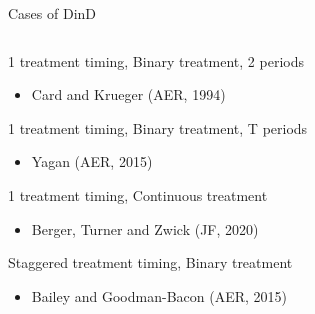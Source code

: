 \documentclass[notes,11pt, aspectratio=169]{beamer}
\newenvironment{wideitemize}{\itemize\addtolength{\itemsep}{10pt}}{\enditemize}
\begin{document}
\begin{frame}{Cases of DinD}
  \begin{columns}[T] %
    \begin{column}{.58\textwidth}
      \begin{wideitemize}
      \item 1 treatment timing, Binary treatment, 2 periods
        \begin{itemize}
        \item Card and Krueger  (AER, 1994)
        \end{itemize}
      \item 1 treatment timing, Binary treatment, T periods
        \begin{itemize}
        \item Yagan (AER, 2015) 
        \end{itemize}
      \item 1 treatment timing, Continuous treatment
        \begin{itemize}
        \item Berger, Turner and Zwick (JF, 2020)
        \end{itemize}
      \item Staggered treatment timing, Binary treatment
        \begin{itemize}
          \item Bailey and Goodman-Bacon (AER, 2015)
        \end{itemize}
      \end{wideitemize}
    \end{column}%
    \hfill%
    \begin{column}{.38\textwidth}
    \end{column}%
  \end{columns}
\end{frame}
\end{document}
